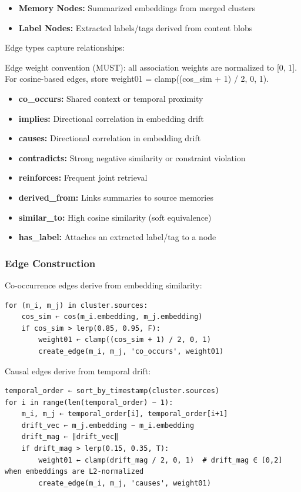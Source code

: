 \documentclass[
  letterpaper,
  DIV=11,
  numbers=noendperiod]{scrartcl}
\providecommand{\tightlist}{%
  \setlength{\itemsep}{0pt}\setlength{\parskip}{0pt}}
\begin{document}
\begin{itemize}
\tightlist
\item
  \textbf{Memory Nodes:} Summarized embeddings from merged clusters
\item
  \textbf{Label Nodes:} Extracted labels/tags derived from content blobs
\end{itemize}

Edge types capture relationships:

Edge weight convention (MUST): all association weights are normalized to
{[}0, 1{]}. For cosine-based edges, store weight01 = clamp((cos\_sim +
1) / 2, 0, 1).

\begin{itemize}
\tightlist
\item
  \textbf{co\_occurs:} Shared context or temporal proximity
\item
  \textbf{implies:} Directional correlation in embedding drift
\item
  \textbf{causes:} Directional correlation in embedding drift
\item
  \textbf{contradicts:} Strong negative similarity or constraint
  violation
\item
  \textbf{reinforces:} Frequent joint retrieval
\item
  \textbf{derived\_from:} Links summaries to source memories
\item
  \textbf{similar\_to:} High cosine similarity (soft equivalence)
\item
  \textbf{has\_label:} Attaches an extracted label/tag to a node
\end{itemize}

\subsubsection{Edge Construction}\label{edge-construction}

Co-occurrence edges derive from embedding similarity:

\begin{verbatim}
for (m_i, m_j) in cluster.sources:
    cos_sim ← cos(m_i.embedding, m_j.embedding)
    if cos_sim > lerp(0.85, 0.95, F):
        weight01 ← clamp((cos_sim + 1) / 2, 0, 1)
        create_edge(m_i, m_j, 'co_occurs', weight01)
\end{verbatim}

Causal edges derive from temporal drift:

\begin{verbatim}
temporal_order ← sort_by_timestamp(cluster.sources)
for i in range(len(temporal_order) − 1):
    m_i, m_j ← temporal_order[i], temporal_order[i+1]
    drift_vec ← m_j.embedding − m_i.embedding
    drift_mag ← ‖drift_vec‖
    if drift_mag > lerp(0.15, 0.35, T):
        weight01 ← clamp(drift_mag / 2, 0, 1)  # drift_mag ∈ [0,2] when embeddings are L2-normalized
        create_edge(m_i, m_j, 'causes', weight01)
\end{verbatim}
\end{document}
